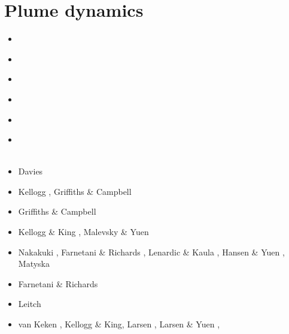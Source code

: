 \section{Plume dynamics}

\begin{scriptsize}
\begin{itemize}
\item[\nineteenseventyone] 
\textcite{morg71} \\
\item[\nineteenseventythree] 
\textcite{toze73} \\
\item[\nineteenseventyfive] 
\textcite{patt75} \\ 
\item[\nineteenseventyseven] 
\textcite{hovo77}\\
\item[\nineteeneighty] 
\textcite{yupe80} \\
\item[\nineteeneightyseven] 
\textcite{zhyu87} \\
\textcite{rism87} \\
\item[\nineteenninety] Davies \cite{davi90}
\item[\nineteenninetyone] Kellogg \cite{kell91}, Griffiths \& Campbell \cite{grca91b}
\item[\nineteenninety] Griffiths \& Campbell \cite{grca90}
\item[\nineteenninetythree] Kellogg \& King \cite{keki93}, Malevsky \& Yuen \cite{mayu93}
\item[\nineteenninetyfour] Nakakuki \etal \cite{nasf94}, Farnetani \& Richards \cite{fari94},
                           Lenardic \& Kaula \cite{leka94b}, Hansen \& Yuen \cite{hayu94},
                           Matyska \etal \cite{mamy94}
\item[\nineteenninetyfive] Farnetani \& Richards \cite{fari95}
\item[\nineteenninetysix] Leitch \etal \cite{lesy96} 
\item[\nineteenninetyseven] van Keken \cite{vank97}, Kellogg \& King\cite{keki97},
                            Larsen \etal \cite{laym97}, Larsen \& Yuen \cite{layu97,layu97b},

\end{itemize}
\end{scriptsize}
